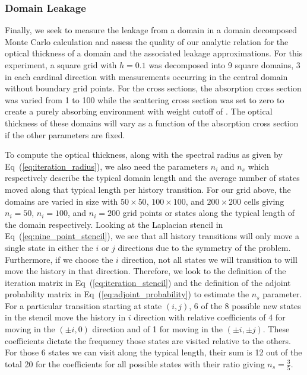 \subsubsection{Domain Leakage }
\label{subsubsec:domain_leakage}
Finally, we seek to measure the leakage from a domain in a domain
decomposed Monte Carlo calculation and assess the quality of our
analytic relation for the optical thickness of a domain and the
associated leakage approximations. For this experiment, a square grid
with $h=0.1$ was decomposed into 9 square domains, 3 in each cardinal
direction with measurements occurring in the central domain without
boundary grid points. For the cross sections, the absorption cross
section was varied from 1 to 100 while the scattering cross
section was set to zero to create a purely absorbing environment
with weight cutoff of . The optical thickness of these
domains will vary as a function of the absorption cross section if
the other parameters are fixed. 

To compute the optical thickness, along with the spectral radius as
given by Eq~(\ref{eq:iteration_radius}), we also need the parameters
$n_i$ and $n_s$ which respectively describe the typical domain length
and the average number of states moved along that typical length per
history transition. For our grid above, the domains are varied in size
with $50 \times 50$, $100 \times 100$, and $200 \times 200$ cells
giving $n_i=50$, $n_i=100$, and $n_i=200$ grid points or states along
the typical length of the domain respectively. Looking at the
Laplacian stencil in Eq~(\ref{eq:nine_point_stencil}), we see that all
history transitions will only move a single state in either the $i$ or
$j$ directions due to the symmetry of the problem. Furthermore, if we
choose the $i$ direction, not all states we will transition to will
move the history in that direction. Therefore, we look to the
definition of the iteration matrix in Eq~(\ref{eq:iteration_stencil})
and the definition of the adjoint probability matrix in
Eq~(\ref{eq:adjoint_probability}) to estimate the $n_s$ parameter. For
a particular transition starting at state $(i,j)$, 6 of the 8 possible
new states in the stencil move the history in $i$ direction with
relative coefficients of 4 for moving in the $(\pm i,0)$ direction and
of 1 for moving in the $(\pm i,\pm j)$. These coefficients dictate the
frequency those states are visited relative to the others. For those 6
states we can visit along the typical length, their sum is 12 out of
the total 20 for the coefficients for all possible states with their
ratio giving $n_s = \frac{3}{5}$.

